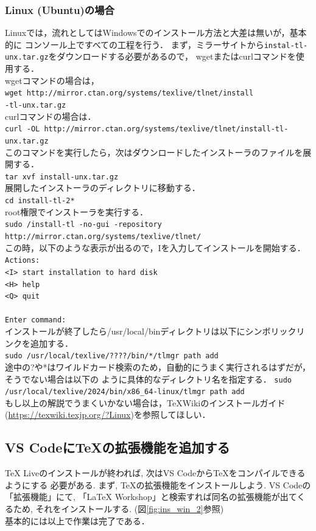 \subsubsection{Linux (Ubuntu)の場合}
Linuxでは，流れとしてはWindowsでのインストール方法と大差は無いが，基本的に
コンソール上ですべての工程を行う．
まず，ミラーサイトから\texttt{instal-tl-unx.tar.gz}をダウンロードする必要があるので，
wgetまたはcurlコマンドを使用する．\\
wgetコマンドの場合は，\\
\texttt{wget http://mirror.ctan.org/systems/texlive/tlnet/install\\-tl-unx.tar.gz}\\
curlコマンドの場合は．\\
\texttt{curl -OL http://mirror.ctan.org/systems/texlive/tlnet/install-tl-unx.tar.gz}\\
このコマンドを実行したら，次はダウンロードしたインストーラのファイルを展開する．\\
\texttt{tar xvf install-unx.tar.gz}\\
展開したインストーラのディレクトリに移動する．\\
\texttt{cd install-tl-2*}\\
root権限でインストーラを実行する．\\
\texttt{sudo /install-tl -no-gui -repository \\
http://mirror.ctan.org/systems/texlive/tlnet/}\\
この時，以下のような表示が出るので，Iを入力してインストールを開始する．
\texttt{
  Actions: \\
  <I> start  installation to hard disk\\
  <H> help\\
  <Q> quit\\
\\
  Enter command: 
}\\
インストールが終了したら/usr/local/binディレクトリは以下にシンボリックリンクを追加する．\\
\texttt{sudo /usr/local/texlive/????/bin/*/tlmgr path add}\\
途中の?や*はワイルドカード検索のため，自動的にうまく実行されるはずだが，そうでない場合は以下の
ように具体的なディレクトリ名を指定する．
\texttt{sudo /usr/local/texlive/2024/bin/x86\_64-linux/tlmgr path add}\\
もし以上の解説でうまくいかない場合は，TeXWikiのインストールガイド(\url{https://texwiki.texjp.org/?Linux})を参照してほしい．

\subsection{VS CodeにTeXの拡張機能を追加する}
TeX Liveのインストールが終われば, 次はVS Codeから\TeX をコンパイルできるようにする
必要がある. まず, \TeX の拡張機能をインストールしよう. VS Codeの「拡張機能」にて, 
「LaTeX Workshop」と検索すれば同名の拡張機能が出てくるため, それをインストールする. 
(図\ref{fig:ins_win_2}参照)\\

基本的には以上で作業は完了である．